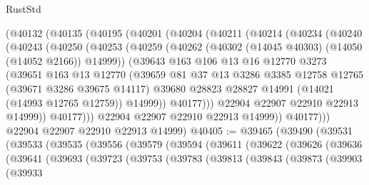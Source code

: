 \begin{lexlean}{RustStd}
\begin{coremodule}
    (@40132
      (@40135
        (@40195
          (@40201
            (@40204
              (@40211
                (@40214
                  (@40234
                    (@40240
                      (@40243
                        (@40250
                          (@40253
                            (@40259
                              (@40262 (@40302 (@14045 @40303) (@14050 (@14052 @2166)) @14999))
                              (@39643
                                @163
                                @106
                                @13
                                @16
                                @12770
                                @3273
                                (@39651
                                  @163
                                  @13
                                  @12770
                                  (@39659
                                    @81
                                    @37
                                    @13
                                    @3286
                                    @3385
                                    @12758
                                    @12765
                                    (@39671 @3286 @39675 @14117)
                                    @39680
                                    @28823
                                    @28827
                                    @14991
                                    (@14021 (@14993 @12765 @12759))
                                    @14999))
                                @40177)))
                          @22904
                          @22907
                          @22910
                          @22913
                          @14999))
                      @40177)))
                @22904
                @22907
                @22910
                @22913
                @14999))
            @40177)))
      @22904
      @22907
      @22910
      @22913
      @14999)
@40405 := @39465
    (@39490
      (@39531
        (@39533
          (@39535
            (@39556
              (@39579
                (@39594
                  (@39611
                    (@39622
                      (@39626
                        (@39636
                          (@39641
                            (@39693
                              (@39723
                                (@39753
                                  (@39783
                                    (@39813
                                      (@39843
                                        (@39873
                                          (@39903
                                            (@39933

\end{coremodule}
\end{lexlean}
